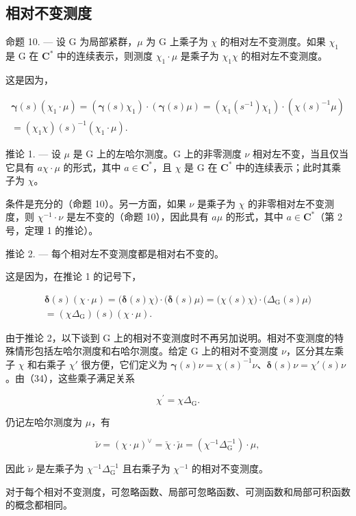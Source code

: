 \subsection{相对不变测度}

命题 10. --- 设 G 为局部紧群，\(\mu\) 为 G 上乘子为 \(\chi\) 的相对左不变测度。如果 \(\chi_{1}\) 是 G 在 \(\mathbf{C}^{*}\) 中的连续表示，则测度 \(\chi_{1} \cdot \mu\) 是乘子为 \(\chi_{1}\chi\) 的相对左不变测度。

这是因为，

\[
\begin{array}{r} \pmb {\gamma} (s) (\chi_ {1} \cdot \mu) = (\pmb {\gamma} (s) \chi_ {1}) \cdot (\pmb {\gamma} (s) \mu) = (\chi_ {1} (s ^ {- 1}) \chi_ {1}) \cdot (\chi (s) ^ {- 1} \mu) \\ = (\chi_ {1} \chi) (s) ^ {- 1} (\chi_ {1} \cdot \mu). \end{array}
\]

推论 1. --- 设 \(\mu\) 是 G 上的左哈尔测度。G 上的非零测度 \(\nu\) 相对左不变，当且仅当它具有 \(a\chi \cdot \mu\) 的形式，其中 \(a \in \mathbf{C}^*\)，且 \(\chi\) 是 G 在 \(\mathbf{C}^*\) 中的连续表示；此时其乘子为 \(\chi\)。

条件是充分的（命题 10）。另一方面，如果 \(\nu\) 是乘子为 \(\chi\) 的非零相对左不变测度，则 \(\chi^{-1} \cdot \nu\) 是左不变的（命题 10），因此具有 \(a\mu\) 的形式，其中 \(a \in \mathbf{C}^*\)（第 2 号，定理 1 的推论）。

推论 2. --- 每个相对左不变测度都是相对右不变的。

这是因为，在推论 1 的记号下，

\[
\begin{array}{c} \boldsymbol {\delta} (s) (\chi \cdot \mu) = \bigl (\boldsymbol {\delta} (s) \chi \bigr) \cdot \bigl (\boldsymbol {\delta} (s) \mu \bigr) = \bigl (\chi (s) \chi \bigr) \cdot \bigl (\Delta_ {\mathrm{G}} (s) \mu \bigr) \\ = (\chi \Delta_ {\mathrm{G}}) (s) (\chi \cdot \mu). \end{array}\tag{34}
\]

由于推论 2，以下谈到 G 上的相对不变测度时不再另加说明。相对不变测度的特殊情形包括左哈尔测度和右哈尔测度。给定 G 上的相对不变测度 \(\nu\)，区分其左乘子 \(\chi\) 和右乘子 \(\chi'\) 很方便，它们定义为 \(\pmb{\gamma}(s)\nu = \chi(s)^{-1}\nu\)、\(\pmb{\delta}(s)\nu = \chi'(s)\nu\)。由（34），这些乘子满足关系

\[
\chi^ {\prime} = \chi \Delta_ {\mathrm{G}}.\tag{35}
\]

仍记左哈尔测度为 \(\mu\)，有

\[
\check {\nu} = (\chi \cdot \mu) ^ {\vee} = \check {\chi} \cdot \check {\mu} = (\chi^ {- 1} \Delta_ {\mathrm{G}} ^ {- 1}) \cdot \mu ,
\]

因此 \(\check{\nu}\) 是左乘子为 \(\chi^{-1}\Delta_{\mathrm{G}}^{-1}\) 且右乘子为 \(\chi^{-1}\) 的相对不变测度。

对于每个相对不变测度，可忽略函数、局部可忽略函数、可测函数和局部可积函数的概念都相同。

